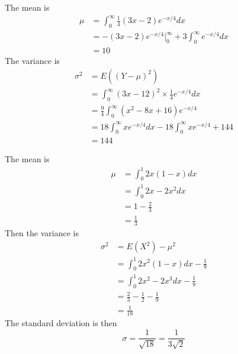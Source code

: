 \documentclass[answers]{exam}
\begin{document}
\begin{questions}
\begin{solution}
	The mean is
	\begin{align*}
		\mu &= \int_0^\infty \frac{1}{4}(3x-2)e^{-x/4}dx \\
		    &= -(3x-2)e^{-x/4} \Big |_0^\infty + 3\int_0^\infty e^{-x/4}dx \\
		    &= 10
	\end{align*}
	The variance is
	\begin{align*}
		\sigma^2 &= E((Y-\mu)^2) \\
			 &= \int_0^\infty (3x-12)^2\times\frac{1}{4}e^{-x/4}dx \\
			 &= \frac{9}{4}\int_0^\infty (x^2 - 8x + 16)e^{-x/4} \\
			 &= 18\int_0^\infty xe^{-x/4}dx - 18\int_0^\infty xe^{-x/4} + 144 \\
			 &= 144
	\end{align*}
\end{solution}


\begin{solution}
	The mean is
	\begin{align*}
		\mu &= \int_0^1 2x(1-x)dx \\
		    &= \int_0^1 2x - 2x^2 dx \\
		    &= 1 - \frac{2}{3} \\
		    &= \frac{1}{3}
	\end{align*}
	Then the variance is
	\begin{align*}
		\sigma^2 &= E(X^2) - \mu^2 \\
			 &= \int_0^1 2x^2(1-x)dx - \frac{1}{9} \\
			 &= \int_0^1 2x^2 - 2x^3 dx - \frac{1}{9} \\
			 &= \frac{2}{3} - \frac{1}{2} - \frac{1}{9} \\
			 &= \frac{1}{18}
	\end{align*}
	The standard deviation is then
	$$\sigma = \frac{1}{\sqrt{18}} = \frac{1}{3\sqrt{2}}$$
\end{solution}



\end{questions}
\end{document}
